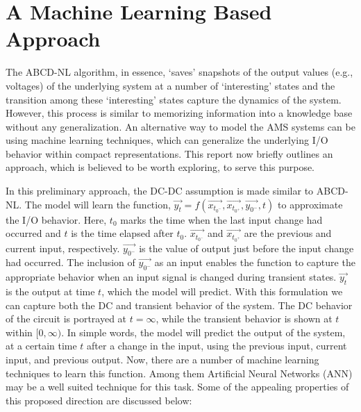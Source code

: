 \documentclass[a4paper]{article}
\begin{document}
\section{A Machine Learning Based Approach}\label{sec:ML}
The ABCD-NL algorithm, in essence, `saves' snapshots of the output values (e.g., voltages) of the underlying system at a number of `interesting' states and the transition among these `interesting' states capture the dynamics of the system. %
However, this process is similar to memorizing information into a knowledge base without any generalization. An alternative way to model the AMS systems can be using machine learning techniques, which can generalize the underlying I/O behavior within compact representations. This report now briefly outlines an approach, which is believed to be worth exploring, to serve this purpose. 


In this preliminary approach, the DC-DC assumption is made similar to ABCD-NL. The model will learn the function, $\vec{y_t} = f (\vec{x_{t_{0^-}}}, \vec{x_{t_{0^+}}}, \vec{y_{0^-}}, t)$ to approximate the I/O behavior.
Here, $t_0$ marks the time when the last input change had occurred and $t$ is the time elapsed after $t_0$. $\vec{x_{t_{0^-}}}$ and $\vec{x_{t_{0^+}}}$ are the previous and current input, respectively. $\vec{y_{0^-}}$ is the value of output just before the input change had occurred. The inclusion of $\vec{y_{0^-}}$ as an input enables the function to capture the appropriate behavior when an input signal is changed during transient states. $\vec{y_t}$ is the output at time $t$, which the model will predict. With this formulation we can capture both the DC and transient behavior of the system. The DC behavior of the circuit is portrayed at $t = \infty$, while the transient behavior is shown at $t$ within $[0, \infty)$. In simple words, the model will predict the output of the system, at a certain time $t$ after a change in the input, using the previous input, current input, and previous output. Now, there are a number of machine learning techniques to learn this function. Among them Artificial Neural Networks (ANN) may be a well suited technique for this task. Some of the appealing properties of this proposed direction are discussed below:  
	

\end{document}
